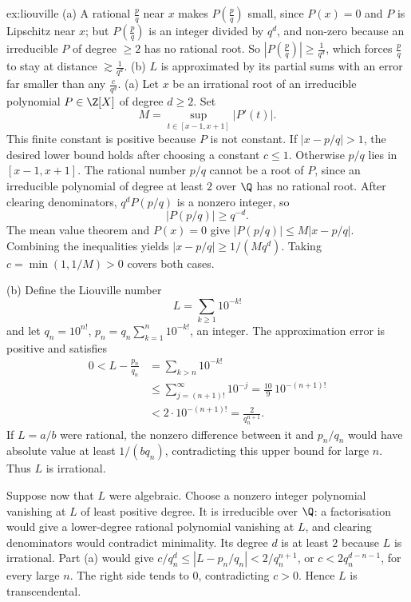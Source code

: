 \begin{solution}{ex:liouville}
\idea (a) A rational $\frac pq$ near $x$ makes $P(\frac pq)$ small, since $P(x)=0$ and $P$ is Lipschitz near $x$; but $P(\frac pq)$ is an integer divided by $q^d$, and non-zero because an irreducible $P$ of degree $\ge2$ has no rational root. So $|P(\frac pq)|\ge\frac1{q^d}$, which forces $\frac pq$ to stay at distance $\gtrsim\frac1{q^d}$. (b) $L$ is approximated by its partial sums with an error far smaller than any $\frac c{q^d}$.
\writeup (a) Let $x$ be an irrational root of an irreducible polynomial $P\in\Z[X]$ of degree $d\ge2$. Set
\[
M=\sup_{t\in[x-1,x+1]}|P'(t)|.
\]
This finite constant is positive because $P$ is not constant. If $|x-p/q|>1$, the desired lower bound holds after choosing a constant $c\le1$. Otherwise $p/q$ lies in $[x-1,x+1]$. The rational number $p/q$ cannot be a root of $P$, since an irreducible polynomial of degree at least $2$ over $\Q$ has no rational root. After clearing denominators, $q^dP(p/q)$ is a nonzero integer, so
\[
|P(p/q)|\ge q^{-d}.
\]
The mean value theorem and $P(x)=0$ give
$|P(p/q)|\le M|x-p/q|$. Combining the inequalities yields
$|x-p/q|\ge1/(Mq^d)$. Taking $c=\min(1,1/M)>0$ covers both cases.

(b) Define the Liouville number
\[
L=\sum_{k\ge1}10^{-k!}
\]
and let $q_n=10^{n!}$, $p_n=q_n\sum_{k=1}^n10^{-k!}$, an integer. The approximation error is positive and satisfies
\[
\begin{aligned}
0<L-\frac{p_n}{q_n}&=\sum_{k>n}10^{-k!}\\
&\le\sum_{j=(n+1)!}^{\infty}10^{-j}
=\frac{10}{9}\,10^{-(n+1)!}\\
&<2\cdot10^{-(n+1)!}=\frac2{q_n^{n+1}}.
\end{aligned}
\]
If $L=a/b$ were rational, the nonzero difference between it and $p_n/q_n$ would have absolute value at least $1/(bq_n)$, contradicting this upper bound for large $n$. Thus $L$ is irrational.

Suppose now that $L$ were algebraic. Choose a nonzero integer polynomial vanishing at $L$ of least positive degree. It is irreducible over $\Q$: a factorisation would give a lower-degree rational polynomial vanishing at $L$, and clearing denominators would contradict minimality. Its degree $d$ is at least $2$ because $L$ is irrational. Part (a) would give
$c/q_n^d\le|L-p_n/q_n|<2/q_n^{n+1}$, or $c<2q_n^{d-n-1}$, for every large $n$. The right side tends to $0$, contradicting $c>0$. Hence $L$ is transcendental.
\end{solution}

